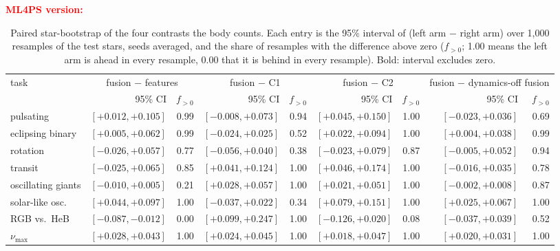 \documentclass{article}
\providecommand{\DIFdelbeginFL}{} %
\providecommand{\DIFscaledelfig}{0.5}
\newlength{\DIFdelgraphicswidth} %
\newlength{\DIFdelgraphicsheight} %
\providecommand{\DIFdelincludegraphics}[2][]{%
\sbox{\DIFdelgraphicsbox}{\DIFOincludegraphics[#1]{#2}}%
\settoboxwidth{\DIFdelgraphicswidth}{\DIFdelgraphicsbox} %
\settoboxtotalheight{\DIFdelgraphicsheight}{\DIFdelgraphicsbox} %
\scalebox{\DIFscaledelfig}{%
\parbox[b]{\DIFdelgraphicswidth}{\usebox{\DIFdelgraphicsbox}\\[-\baselineskip] \rule{\DIFdelgraphicswidth}{0em}}\llap{\resizebox{\DIFdelgraphicswidth}{\DIFdelgraphicsheight}{%
\setlength{\unitlength}{\DIFdelgraphicswidth}%
\begin{picture}(1,1)%
\thicklines\linethickness{2pt} %
{\color[rgb]{1,0,0}\put(0,0){\framebox(1,1){}}}%
{\color[rgb]{1,0,0}\put(0,0){\line( 1,1){1}}}%
{\color[rgb]{1,0,0}\put(0,1){\line(1,-1){1}}}%
\end{picture}%
}\hspace*{3pt}}} %
} %
\DeclareRobustCommand{\DIFdelbeginFL}{\DIFOdelbeginFL \let\includegraphics\DIFdelincludegraphics} %
\begin{document}
\begin{table}[H]
\caption{Paired star-bootstrap of the four contrasts the body counts. Each entry is the 95\% interval
of (left arm $-$ right arm) over 1{,}000 resamples of the test stars, seeds averaged, and the share of
resamples with the difference above zero ($f_{>0}$; 1.00 means the left arm is ahead in every
resample, 0.00 that it is behind in every resample). Bold: interval excludes zero.}
\label{tab:bootstrap}
\centering
\scriptsize
\setlength{\tabcolsep}{2pt}
\DIFdelbeginFL
{\scriptsize\textcolor{red}{\textbf{ML4PS version:}}}\par\nobreak\smallskip
\begingroup\color{red}
\begin{tabular}{lrrrrrrrr}
\toprule
task & \multicolumn{2}{c}{fusion $-$ features} & \multicolumn{2}{c}{fusion $-$ C1} & \multicolumn{2}{c}{fusion $-$ C2} & \multicolumn{2}{c}{fusion $-$ dynamics-off fusion} \\
 & 95\% CI & $f_{>0}$ & 95\% CI & $f_{>0}$ & 95\% CI & $f_{>0}$ & 95\% CI & $f_{>0}$ \\
\midrule
pulsating & $\mathbf{[+0.012, +0.105]}$ & 0.99 & $[-0.008, +0.073]$ & 0.94 & $\mathbf{[+0.045, +0.150]}$ & 1.00 & $[-0.023, +0.036]$ & 0.69 \\
eclipsing binary & $\mathbf{[+0.005, +0.062]}$ & 0.99 & $[-0.024, +0.025]$ & 0.52 & $\mathbf{[+0.022, +0.094]}$ & 1.00 & $\mathbf{[+0.004, +0.038]}$ & 0.99 \\
rotation & $[-0.026, +0.057]$ & 0.77 & $[-0.056, +0.040]$ & 0.38 & $[-0.023, +0.079]$ & 0.87 & $[-0.005, +0.052]$ & 0.94 \\
transit & $[-0.025, +0.065]$ & 0.85 & $\mathbf{[+0.041, +0.124]}$ & 1.00 & $\mathbf{[+0.046, +0.174]}$ & 1.00 & $[-0.016, +0.035]$ & 0.78 \\
oscillating giants & $[-0.010, +0.005]$ & 0.21 & $\mathbf{[+0.028, +0.057]}$ & 1.00 & $\mathbf{[+0.021, +0.051]}$ & 1.00 & $[-0.002, +0.008]$ & 0.87 \\
solar-like osc. & $\mathbf{[+0.044, +0.097]}$ & 1.00 & $[-0.037, +0.022]$ & 0.34 & $\mathbf{[+0.079, +0.151]}$ & 1.00 & $\mathbf{[+0.025, +0.067]}$ & 1.00 \\
RGB vs.\ HeB & $\mathbf{[-0.087, -0.012]}$ & 0.00 & $\mathbf{[+0.099, +0.247]}$ & 1.00 & $[-0.126, +0.020]$ & 0.08 & $[-0.037, +0.039]$ & 0.52 \\
$\nu_{\max}$ & $\mathbf{[+0.028, +0.043]}$ & 1.00 & $\mathbf{[+0.024, +0.045]}$ & 1.00 & $\mathbf{[+0.018, +0.047]}$ & 1.00 & $\mathbf{[+0.020, +0.031]}$ & 1.00 \\

\end{tabular}
\end{table}
\end{document}
